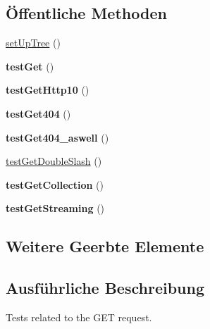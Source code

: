 \subsection*{Öffentliche Methoden}
\begin{DoxyCompactItemize}
\item 
\mbox{\hyperlink{class_sabre_1_1_d_a_v_1_1_http_get_test_a8d42be6fbd63efe9669dfd28c6df1a35}{set\+Up\+Tree}} ()
\item 
\mbox{\label{class_sabre_1_1_d_a_v_1_1_http_get_test_ad38596a372bd27f4fc04a65d107c8713}} 
{\bfseries test\+Get} ()
\item 
\mbox{\label{class_sabre_1_1_d_a_v_1_1_http_get_test_ac40f579fc396b3d2fb2050935547c40c}} 
{\bfseries test\+Get\+Http10} ()
\item 
\mbox{\label{class_sabre_1_1_d_a_v_1_1_http_get_test_a9b31f5a45278fb3fc76ca886d9f19bb3}} 
{\bfseries test\+Get404} ()
\item 
\mbox{\label{class_sabre_1_1_d_a_v_1_1_http_get_test_a59320dcff61bcfecba8d9c0d7dcddc40}} 
{\bfseries test\+Get404\+\_\+aswell} ()
\item 
\mbox{\hyperlink{class_sabre_1_1_d_a_v_1_1_http_get_test_af28a2f3127a7f53355767b23d7f0c604}{test\+Get\+Double\+Slash}} ()
\item 
\mbox{\label{class_sabre_1_1_d_a_v_1_1_http_get_test_a7ae43421f50a74ed037b97f59282ef2b}} 
{\bfseries test\+Get\+Collection} ()
\item 
\mbox{\label{class_sabre_1_1_d_a_v_1_1_http_get_test_aee4215de9c37159945e43e8a81884160}} 
{\bfseries test\+Get\+Streaming} ()
\end{DoxyCompactItemize}
\subsection*{Weitere Geerbte Elemente}


\subsection{Ausführliche Beschreibung}
Tests related to the G\+ET request.

